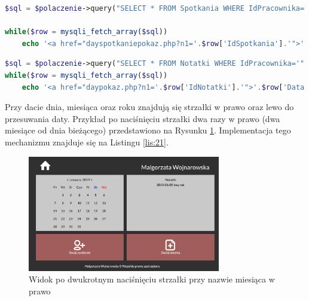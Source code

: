 \documentclass[eng,printmode,openany,oneside]{mgr}
\begin{document}
	
\begin{lstlisting}[caption={Pobranie spotkań z danego dnia i wyświetlenie ich}, language=PHP, label={lis:19}]
$sql = $polaczenie->query("SELECT * FROM Spotkania WHERE IdPracownika='".$prac['IdPracownika']."' AND MONTH(Data)='".$data->format('m')."' AND DAY(Data)='".$data->format('d')."' AND YEAR(Data)='".$data->format('Y')."'");

while($row = mysqli_fetch_array($sql))
	echo '<a href="dayspotkaniepokaz.php?n1='.$row['IdSpotkania'].'">'.$row['Godzina'].' '.$row['Tytul'].'</a><br/>';
\end{lstlisting}

	
	
	
\begin{lstlisting}[caption={Pobranie notatek z danego dnia i wyświetlenie ich}, language=PHP, label={lis:20}]
$sql = $polaczenie->query("SELECT * FROM Notatki WHERE IdPracownika='".$prac['IdPracownika']."' AND MONTH(Data)='".$data->format('m')."' AND DAY(Data)='".$data->format('d')."' AND YEAR(Data)='".$data->format('Y')."'");
while($row = mysqli_fetch_array($sql))
	echo '<a href="daypokaz.php?n1='.$row['IdNotatki'].'">'.$row['Data'].' '.$row['Tytul'].'</a><br/>';
\end{lstlisting}

	
Przy dacie dnia, miesiąca oraz roku znajdują się strzałki w prawo oraz lewo do przesuwania daty. Przykład po naciśnięciu strzałki dwa razy w prawo (dwa miesiące od dnia bieżącego) przedstawiono na Rysunku \ref{fig:25}. Implementacja tego mechanizmu znajduje się na Listingu \ref{lis:21}.


	
	\begin{figure}[H]
		\centering
		\includegraphics[width=0.75\textwidth]{miesiac_innyrok}
		\caption{Widok po dwukrotnym naciśnięciu strzałki przy nazwie miesiąca w prawo}
		\label{fig:25}
	\end{figure}
	
\end{document}
